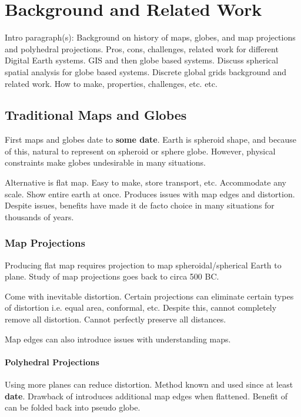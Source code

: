 \chapter{Background and Related Work} \label{chap:background}
Intro paragraph(s):
Background on history of maps, globes, and map projections and polyhedral projections.
Pros, cons, challenges, related work for different Digital Earth systems.
GIS and then globe based systems.
Discuss spherical spatial analysis for globe based systems.
Discrete global grids background and related work.
How to make, properties, challenges, etc. etc.


\section{Traditional Maps and Globes}
First maps and globes date to \textbf{some date}.
Earth is spheroid shape, and because of this, natural to represent on spheroid or sphere globe.
However, physical constraints make globes undesirable in many situations.


Alternative is flat map.
Easy to make, store transport, etc.
Accommodate any scale.
Show entire earth at once.
Produces issues with map edges and distortion.
Despite issues, benefits have made it de facto choice in many situations for thousands of years.
\cite{hruby20182000}


\subsection{Map Projections}
Producing flat map requires projection to map spheroidal/spherical Earth to plane.
Study of map projections goes back to circa 500 BC.
\cite{snyder1987map}
\cite{snyder1997flattening}


Come with inevitable distortion.
Certain projections can eliminate certain types of distortion i.e. equal area, conformal, etc.
Despite this, cannot completely remove all distortion.
Cannot perfectly preserve all distances.
\cite{mathematics paper on distortion}
\cite{planar area preserving}
\cite{planar conformal}


Map edges can also introduce issues with understanding maps.
\cite{hennerdal2015beyond}
\cite{hruby2016journey}


\subsubsection{Polyhedral Projections}
Using more planes can reduce distortion.
Method known and used since at least \textbf{date}.
Drawback of introduces additional map edges when flattened.
Benefit of can be folded back into pseudo globe.
\cite{bradley1946equal}
\cite{snyder1992equal}
\cite{van2006slice}
\cite{rocsca2011uniform}
\cite{rocsca2012area}
\cite{holhocs2014octahedral}
\cite{harrison2011optimization}


